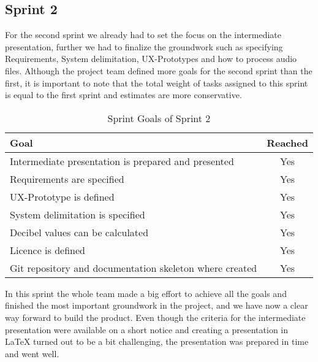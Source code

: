 \subsection{Sprint 2}\label{subsec:sprint-2}
For the second sprint we already had to set the focus on the intermediate presentation, further we had to finalize the
groundwork such as specifying Requirements, System delimitation, UX-Prototypes and how to process audio files.
Although the project team defined more goals for the second sprint than the first, it is important to note that the total weight of tasks assigned to this
sprint is equal to the first sprint and estimates are more conservative.
\begin{table}[H]
    \centering
    \begin{tabularx}{\textwidth}{X c}
        \toprule
        \textbf{Goal}                                         & \textbf{Reached} \\
        \midrule
        Intermediate presentation is prepared and presented   & Yes              \\
        \midrule
        Requirements are specified                            & Yes              \\
        \midrule
        UX-Prototype is defined                               & Yes              \\
        \midrule
        System delimitation is specified                      & Yes              \\
        \midrule
        Decibel values can be calculated                      & Yes              \\
        \midrule
        Licence is defined                                    & Yes              \\
        \midrule
        Git repository and documentation skeleton where created & Yes            \\
        \bottomrule
    \end{tabularx}
    \caption{Sprint Goals of Sprint 2}\label{tab:sprint_goals2}
\end{table}
In this sprint the whole team made a big effort to achieve all the goals and finished the most important groundwork in
the project, and we have now a clear way forward to build the product.
Even though the criteria for the intermediate presentation were available on a short notice and creating a presentation
in LaTeX turned out to be a bit challenging, the presentation was prepared in time and went well.

